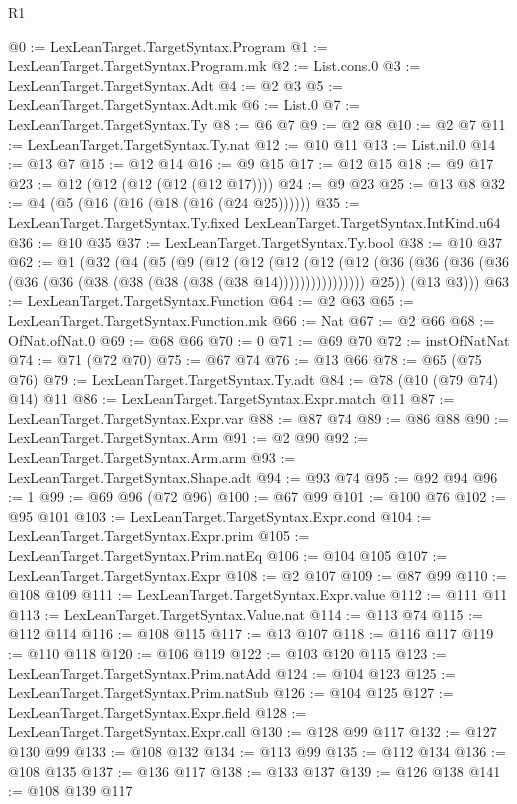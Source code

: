 \begin{lexlean}{R1}
\begin{coremodule}
@0 := LexLeanTarget.TargetSyntax.Program
@1 := LexLeanTarget.TargetSyntax.Program.mk
@2 := List.cons.{0}
@3 := LexLeanTarget.TargetSyntax.Adt
@4 := @2 @3
@5 := LexLeanTarget.TargetSyntax.Adt.mk
@6 := List.{0}
@7 := LexLeanTarget.TargetSyntax.Ty
@8 := @6 @7
@9 := @2 @8
@10 := @2 @7
@11 := LexLeanTarget.TargetSyntax.Ty.nat
@12 := @10 @11
@13 := List.nil.{0}
@14 := @13 @7
@15 := @12 @14
@16 := @9 @15
@17 := @12 @15
@18 := @9 @17
@23 := @12 (@12 (@12 (@12 (@12 @17))))
@24 := @9 @23
@25 := @13 @8
@32 := @4 (@5 (@16 (@16 (@18 (@16 (@24 @25))))))
@35 := LexLeanTarget.TargetSyntax.Ty.fixed LexLeanTarget.TargetSyntax.IntKind.u64
@36 := @10 @35
@37 := LexLeanTarget.TargetSyntax.Ty.bool
@38 := @10 @37
@62 := @1
    (@32
      (@4
        (@5
          (@9
            (@12
              (@12
                (@12
                  (@12
                    (@12 (@36 (@36 (@36 (@36 (@36 (@36 (@38 (@38 (@38 (@38 (@38 @14))))))))))))))))
            @25))
        (@13 @3)))
@63 := LexLeanTarget.TargetSyntax.Function
@64 := @2 @63
@65 := LexLeanTarget.TargetSyntax.Function.mk
@66 := Nat
@67 := @2 @66
@68 := OfNat.ofNat.{0}
@69 := @68 @66
@70 := 0
@71 := @69 @70
@72 := instOfNatNat
@74 := @71 (@72 @70)
@75 := @67 @74
@76 := @13 @66
@78 := @65 (@75 @76)
@79 := LexLeanTarget.TargetSyntax.Ty.adt
@84 := @78 (@10 (@79 @74) @14) @11
@86 := LexLeanTarget.TargetSyntax.Expr.match @11
@87 := LexLeanTarget.TargetSyntax.Expr.var
@88 := @87 @74
@89 := @86 @88
@90 := LexLeanTarget.TargetSyntax.Arm
@91 := @2 @90
@92 := LexLeanTarget.TargetSyntax.Arm.arm
@93 := LexLeanTarget.TargetSyntax.Shape.adt
@94 := @93 @74
@95 := @92 @94
@96 := 1
@99 := @69 @96 (@72 @96)
@100 := @67 @99
@101 := @100 @76
@102 := @95 @101
@103 := LexLeanTarget.TargetSyntax.Expr.cond
@104 := LexLeanTarget.TargetSyntax.Expr.prim
@105 := LexLeanTarget.TargetSyntax.Prim.natEq
@106 := @104 @105
@107 := LexLeanTarget.TargetSyntax.Expr
@108 := @2 @107
@109 := @87 @99
@110 := @108 @109
@111 := LexLeanTarget.TargetSyntax.Expr.value
@112 := @111 @11
@113 := LexLeanTarget.TargetSyntax.Value.nat
@114 := @113 @74
@115 := @112 @114
@116 := @108 @115
@117 := @13 @107
@118 := @116 @117
@119 := @110 @118
@120 := @106 @119
@122 := @103 @120 @115
@123 := LexLeanTarget.TargetSyntax.Prim.natAdd
@124 := @104 @123
@125 := LexLeanTarget.TargetSyntax.Prim.natSub
@126 := @104 @125
@127 := LexLeanTarget.TargetSyntax.Expr.field
@128 := LexLeanTarget.TargetSyntax.Expr.call
@130 := @128 @99 @117
@132 := @127 @130 @99
@133 := @108 @132
@134 := @113 @99
@135 := @112 @134
@136 := @108 @135
@137 := @136 @117
@138 := @133 @137
@139 := @126 @138
@141 := @108 @139 @117

\end{coremodule}
\end{lexlean}
